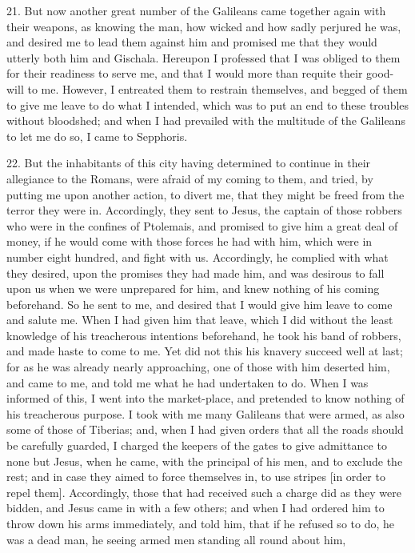 21. But now another great number of the Galileans came together again with
their weapons, as knowing the man, how wicked and how sadly perjured he
was, and desired me to lead them against him and promised me that they
would utterly both him and Gischala. Hereupon I professed that I was
obliged to them for their readiness to serve me, and that I would more
than requite their good-will to me. However, I entreated them to restrain
themselves, and begged of them to give me leave to do what I intended,
which was to put an end to these troubles without bloodshed; and when I
had prevailed with the multitude of the Galileans to let me do so, I came
to Sepphoris.

22. But the inhabitants of this city having determined to continue in
their allegiance to the Romans, were afraid of my coming to them, and
tried, by putting me upon another action, to divert me, that they might be
freed from the terror they were in. Accordingly, they sent to Jesus, the
captain of those robbers who were in the confines of Ptolemais, and
promised to give him a great deal of money, if he would come with those
forces he had with him, which were in number eight hundred, and fight with
us. Accordingly, he complied with what they desired, upon the promises
they had made him, and was desirous to fall upon us when we were
unprepared for him, and knew nothing of his coming beforehand. So he sent
to me, and desired that I would give him leave to come and salute me. When
I had given him that leave, which I did without the least knowledge of his
treacherous intentions beforehand, he took his band of robbers, and made
haste to come to me. Yet did not this his knavery succeed well at last;
for as he was already nearly approaching, one of those with him deserted
him, and came to me, and told me what he had undertaken to do. When I was
informed of this, I went into the market-place, and pretended to know
nothing of his treacherous purpose. I took with me many Galileans that
were armed, as also some of those of Tiberias; and, when I had given
orders that all the roads should be carefully guarded, I charged the
keepers of the gates to give admittance to none but Jesus, when he came,
with the principal of his men, and to exclude the rest; and in case they
aimed to force themselves in, to use stripes [in order to repel them].
Accordingly, those that had received such a charge did as they were
bidden, and Jesus came in with a few others; and when I had ordered him to
throw down his arms immediately, and told him, that if he refused so to
do, he was a dead man, he seeing armed men standing all round about him,
